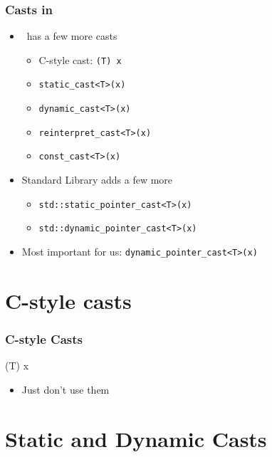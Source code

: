 \begin{frame}
  \frametitle{Casts in \cpp}
  \begin{itemize}
    \item \cpp~has a few more casts
          \begin{itemize}
            \item C-style cast: {\tt (T) x}
            \item {\tt static\_cast<T>(x)}
            \item {\tt dynamic\_cast<T>(x)}
            \item {\tt reinterpret\_cast<T>(x)}
            \item {\tt const\_cast<T>(x)}
          \end{itemize}
          \vskip5mm
    \item Standard Library adds a few more
          \begin{itemize}
            \item {\tt std::static\_pointer\_cast<T>(x)}
            \item {\tt std::dynamic\_pointer\_cast<T>(x)}
          \end{itemize}
          \vskip5mm
    \item Most important for us: {\tt dynamic\_pointer\_cast<T>(x)}
  \end{itemize}
\end{frame}

\section{C-style casts}

\frame{\tableofcontents[currentsection]}

\begin{frame}
  \frametitle{C-style Casts}
  \begin{center} \ttfamily
    (T) x
  \end{center}
  \vskip5mm
  \begin{itemize}
    \item Just don't use them
  \end{itemize}
\end{frame}

\section{Static and Dynamic Casts}

\frame{\tableofcontents[currentsection]}


